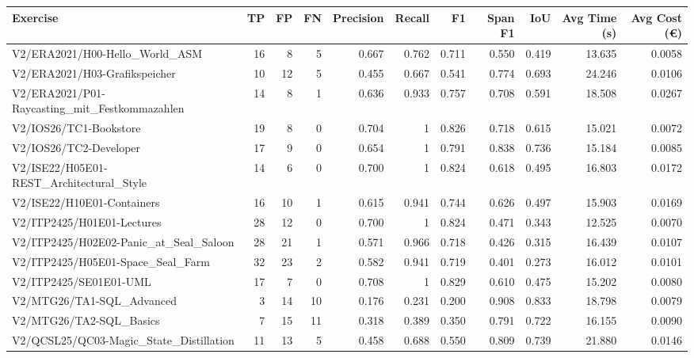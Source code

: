 \begin{tabular}{lrrrrrrrrrr}
Exercise & TP & FP & FN & Precision & Recall & F1 & Span F1 & IoU & Avg Time (s) & Avg Cost (€) \\
\hline
V2/ERA2021/H00-Hello\_World\_ASM & 16 & 8 & 5 & 0.667 & 0.762 & 0.711 & 0.550 & 0.419 & 13.635 & 0.0058 \\
V2/ERA2021/H03-Grafikspeicher & 10 & 12 & 5 & 0.455 & 0.667 & 0.541 & 0.774 & 0.693 & 24.246 & 0.0106 \\
V2/ERA2021/P01-Raycasting\_mit\_Festkommazahlen & 14 & 8 & 1 & 0.636 & 0.933 & 0.757 & 0.708 & 0.591 & 18.508 & 0.0267 \\
V2/IOS26/TC1-Bookstore & 19 & 8 & 0 & 0.704 & 1 & 0.826 & 0.718 & 0.615 & 15.021 & 0.0072 \\
V2/IOS26/TC2-Developer & 17 & 9 & 0 & 0.654 & 1 & 0.791 & 0.838 & 0.736 & 15.184 & 0.0085 \\
V2/ISE22/H05E01-REST\_Architectural\_Style & 14 & 6 & 0 & 0.700 & 1 & 0.824 & 0.618 & 0.495 & 16.803 & 0.0172 \\
V2/ISE22/H10E01-Containers & 16 & 10 & 1 & 0.615 & 0.941 & 0.744 & 0.626 & 0.497 & 15.903 & 0.0169 \\
V2/ITP2425/H01E01-Lectures & 28 & 12 & 0 & 0.700 & 1 & 0.824 & 0.471 & 0.343 & 12.525 & 0.0070 \\
V2/ITP2425/H02E02-Panic\_at\_Seal\_Saloon & 28 & 21 & 1 & 0.571 & 0.966 & 0.718 & 0.426 & 0.315 & 16.439 & 0.0107 \\
V2/ITP2425/H05E01-Space\_Seal\_Farm & 32 & 23 & 2 & 0.582 & 0.941 & 0.719 & 0.401 & 0.273 & 16.012 & 0.0101 \\
V2/ITP2425/SE01E01-UML & 17 & 7 & 0 & 0.708 & 1 & 0.829 & 0.610 & 0.475 & 15.202 & 0.0080 \\
V2/MTG26/TA1-SQL\_Advanced & 3 & 14 & 10 & 0.176 & 0.231 & 0.200 & 0.908 & 0.833 & 18.798 & 0.0079 \\
V2/MTG26/TA2-SQL\_Basics & 7 & 15 & 11 & 0.318 & 0.389 & 0.350 & 0.791 & 0.722 & 16.155 & 0.0090 \\
V2/QCSL25/QC03-Magic\_State\_Distillation & 11 & 13 & 5 & 0.458 & 0.688 & 0.550 & 0.809 & 0.739 & 21.880 & 0.0146 \\
\end{tabular}
